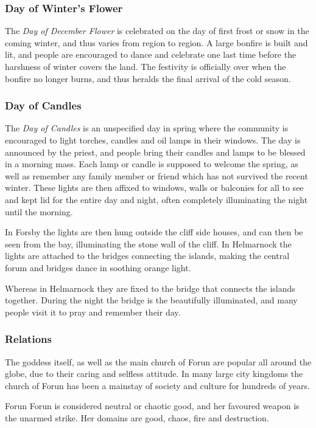 \subsubsection{Day of Winter's Flower}
\label{sec:Day of Winters Flower}

The \emph{Day of December Flower} is celebrated on the day of first frost or
snow in the coming winter, and thus varies from region to region. A large
bonfire is built and lit, and people are encouraged to dance and celebrate one
last time before the harshness of winter covers the land. The festivity is
officially over when the bonfire no longer burns, and thus heralds the final
arrival of the cold season.

\subsubsection{Day of Candles}
\label{sec:Day of Candles}

The \emph{Day of Candles} is an unspecified day in spring where the community
is encouraged to light torches, candles and oil lamps in their windows. The
day is announced by the priest, and people bring their candles and lamps to be
blessed in a morning mass. Each lamp or candle is supposed to welcome the
spring, as well as remember any family member or friend which has not survived
the recent winter. These lights are then affixed to windows, walls or balconies
for all to see and kept lid for the entire day and night, often completely
illuminating the night until the morning.

In Forsby the lights are then hung outside the cliff side houses, and can then
be seen from the bay, illuminating the stone wall of the cliff. In Helmarnock
the lights are attached to the bridges connecting the islands, making the
central forum and bridges dance in soothing orange light.

Whereas in Helmarnock they are fixed to the bridge that connects the islands
together. During the night the bridge is the beautifully illuminated, and many
people visit it to pray and remember their day.

\subsubsection{Relations}

The goddess itself, as well as the main church of Forun are popular all around
the globe, due to their caring and selfless attitude. In many large city
kingdoms the church of Forun has been a mainstay of society and culture for
hundreds of years.

\begin{35e}{Forun}
  Forun is considered neutral or chaotic good, and her favoured weapon is the
  unarmed strike. Her domains are good, chaos, fire and destruction.
\end{35e}
